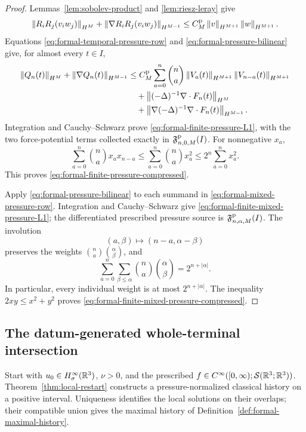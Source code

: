 \begin{proof}
Lemmas~\ref{lem:sobolev-product} and \ref{lem:riesz-leray} give
\begin{equation}
 \left\lVert R_iR_j(v_i w_j)\right\rVert_{H^M}
 +\left\lVert \nabla R_iR_j(v_i w_j)\right\rVert_{H^{M-1}}
 \le C_M^{\rm p}\left\lVert v\right\rVert_{H^{M+1}}\left\lVert w\right\rVert_{H^{M+1}}.
 \label{eq:formal-pressure-bilinear}
\end{equation}
Equations \eqref{eq:formal-temporal-pressure-row} and
\eqref{eq:formal-pressure-bilinear} give, for almost every \(t\in I\),
\begin{align*}
 \left\lVert Q_n(t)\right\rVert_{H^M}
 +\left\lVert \nabla Q_n(t)\right\rVert_{H^{M-1}}
 &\le
 C_M^{\rm p}\sum_{a=0}^{n}\binom na
 \left\lVert V_a(t)\right\rVert_{H^{M+1}}
 \left\lVert V_{n-a}(t)\right\rVert_{H^{M+1}}\\
 &\quad+\left\lVert (-\Delta)^{-1}\nabla\cdot F_n(t)\right\rVert_{H^M}\\
 &\quad+\left\lVert \nabla(-\Delta)^{-1}\nabla\cdot F_n(t)\right\rVert_{H^{M-1}}.
\end{align*}
Integration and Cauchy--Schwarz prove
\eqref{eq:formal-finite-pressure-L1}, with the two force-potential terms
collected exactly in \(\mathfrak F^{\rm p}_{n,0,M}(I)\).  For nonnegative \(x_a\),
\[
 \sum_{a=0}^{n}\binom nax_ax_{n-a}
 \le
 \sum_{a=0}^{n}\binom nax_a^2
 \le
 2^n\sum_{a=0}^{n}x_a^2.
\]
This proves \eqref{eq:formal-finite-pressure-compressed}.

Apply \eqref{eq:formal-pressure-bilinear} to each summand in
\eqref{eq:formal-mixed-pressure-row}.  Integration and Cauchy--Schwarz give
\eqref{eq:formal-finite-mixed-pressure-L1}; the differentiated prescribed
pressure source is \(\mathfrak F^{\rm p}_{n,\alpha,M}(I)\).  The involution
\[
 (a,\beta)\longmapsto(n-a,\alpha-\beta)
\]
preserves the weights
\(\binom na\binom{\alpha}{\beta}\), and
\[
 \sum_{a=0}^{n}\sum_{\beta\le\alpha}
 \binom na\binom{\alpha}{\beta}
 =2^{n+|\alpha|}.
\]
In particular, every individual weight is at most \(2^{n+|\alpha|}\).
The inequality \(2xy\le x^2+y^2\) proves
\eqref{eq:formal-finite-mixed-pressure-compressed}.
\end{proof}


\subsection{The datum-generated whole-terminal intersection}
\label{sec:independent-intersection}

Start with \(u_0\in H^\infty_\sigma(\mathbb R^3)\), \(\nu>0\), and the prescribed
\(f\in C^\infty([0,\infty);\mathcal S(\mathbb R^3;\mathbb R^3))\).
Theorem~\ref{thm:local-restart} constructs a pressure-normalized classical
history on a positive interval. Uniqueness identifies the local solutions
on their overlaps; their compatible union gives the maximal history of
Definition~\ref{def:formal-maximal-history}.

